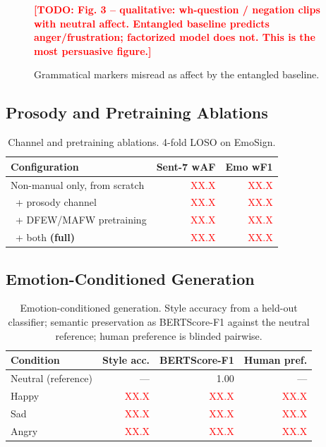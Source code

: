 \documentclass[conference]{IEEEtran}
\newcommand{\TODO}[1]{\textcolor{red}{\textbf{[TODO: #1]}}}
\newcommand{\NUM}{\textcolor{red}{XX.X}}
\begin{document}
\begin{figure}[t]
\centering
\TODO{Fig. 3 -- qualitative: wh-question / negation clips with neutral affect. Entangled baseline
predicts anger/frustration; factorized model does not. This is the most persuasive figure.}
\caption{Grammatical markers misread as affect by the entangled baseline.}
\label{fig:qualitative}
\end{figure}

\subsection{Prosody and Pretraining Ablations}
\begin{table}[t]
\caption{Channel and pretraining ablations. 4-fold LOSO on EmoSign.}
\label{tab:ablation}
\centering
\small
\begin{tabular}{@{}lrr@{}}
\toprule
Configuration & Sent-7 wAF & Emo wF1 \\
\midrule
Non-manual only, from scratch        & \NUM & \NUM \\
\ + prosody channel                  & \NUM & \NUM \\
\ + DFEW/MAFW pretraining            & \NUM & \NUM \\
\ + both \textbf{(full)}             & \NUM & \NUM \\
\bottomrule
\end{tabular}
\end{table}

\subsection{Emotion-Conditioned Generation}
\begin{table}[t]
\caption{Emotion-conditioned generation. Style accuracy from a held-out classifier; semantic
preservation as BERTScore-F1 against the neutral reference; human preference is blinded pairwise.}
\label{tab:generation}
\centering
\small
\begin{tabular}{@{}lrrr@{}}
\toprule
Condition & Style acc. & BERTScore-F1 & Human pref. \\
\midrule
Neutral (reference) & ---  & 1.00 & --- \\
Happy               & \NUM & \NUM & \NUM \\
Sad                 & \NUM & \NUM & \NUM \\
Angry               & \NUM & \NUM & \NUM \\
\bottomrule
\end{tabular}
\end{table}
\end{document}
